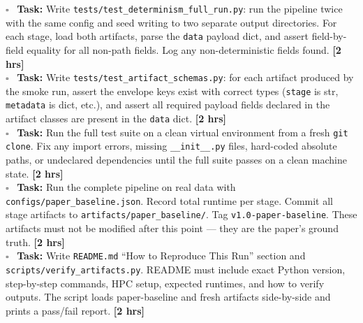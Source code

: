 \documentclass[11pt]{article}
\newcommand{\hrs}[1]{\textbf{[#1 hrs]}}
\newcommand{\task}[2]{%
  \noindent\textbf{Task:} #1 \hfill \hrs{#2}\\}
\newcommand{\done}{\textcolor{sectionblue}{$\square$}\ }
\begin{document}
\begin{taskbox}
\done \task{Write \texttt{tests/test\_determinism\_full\_run.py}: run the
  pipeline twice with the same config and seed writing to two separate
  output directories. For each stage, load both artifacts, parse the
  \texttt{data} payload dict, and assert field-by-field equality for all
  non-path fields. Log any non-deterministic fields found.}{2}

\done \task{Write \texttt{tests/test\_artifact\_schemas.py}: for each artifact
  produced by the smoke run, assert the envelope keys exist with correct
  types (\texttt{stage} is str, \texttt{metadata} is dict, etc.), and assert
  all required payload fields declared in the artifact classes are present
  in the \texttt{data} dict.}{2}

\done \task{Run the full test suite on a clean virtual environment from a fresh
  \texttt{git clone}. Fix any import errors, missing \texttt{\_\_init\_\_.py}
  files, hard-coded absolute paths, or undeclared dependencies until the full
  suite passes on a clean machine state.}{2}

\done \task{Run the complete pipeline on real data with
  \texttt{configs/paper\_baseline.json}. Record total runtime per stage.
  Commit all stage artifacts to \texttt{artifacts/paper\_baseline/}.
  Tag \texttt{v1.0-paper-baseline}. These artifacts must not be modified
  after this point --- they are the paper's ground truth.}{2}

\done \task{Write \texttt{README.md} ``How to Reproduce This Run'' section
  and \texttt{scripts/verify\_artifacts.py}. README must include exact Python
  version, step-by-step commands, HPC setup, expected runtimes, and how to
  verify outputs. The script loads paper-baseline and fresh artifacts
  side-by-side and prints a pass/fail report.}{2}
\end{taskbox}

\end{document}
